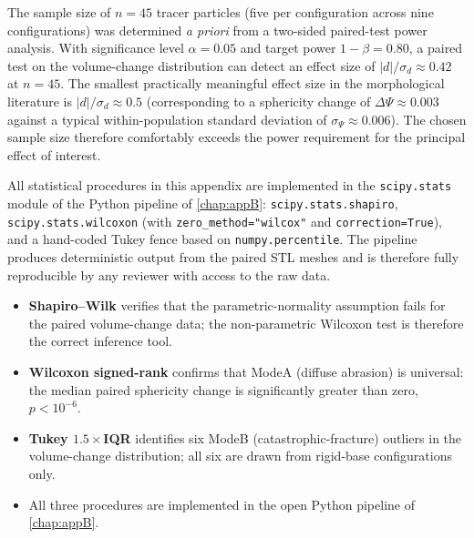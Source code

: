 The sample size of $n=45$ tracer particles (five per configuration
across nine configurations) was determined \emph{a priori} from a
two-sided paired-test power analysis. With significance level
$\alpha=0.05$ and target power $1-\beta = 0.80$, a paired test on the
volume-change distribution can detect an effect size of
$|d|/\sigma_d \approx 0.42$ at $n=45$. The smallest practically
meaningful effect size in the morphological literature is
$|d|/\sigma_d \approx 0.5$ (corresponding to a sphericity change of
$\Delta \Psi \approx 0.003$ against a typical within-population
standard deviation of $\sigma_\Psi \approx 0.006$). The chosen
sample size therefore comfortably exceeds the power requirement for
the principal effect of interest.

\begin{thesisnote}[title=Reproducibility]
All statistical procedures in this appendix are implemented in the
\texttt{scipy.stats} module of the Python pipeline of
\cref{chap:appB}: \texttt{scipy.stats.shapiro},
\texttt{scipy.stats.wilcoxon} (with \texttt{zero\_method="wilcox"}
and \texttt{correction=True}), and a hand-coded Tukey fence based on
\texttt{numpy.percentile}. The pipeline produces deterministic
output from the paired \gls{STL} meshes and is therefore fully
reproducible by any reviewer with access to the raw data.
\end{thesisnote}

\begin{chaptertakeaways}
\begin{itemize}[leftmargin=*,itemsep=2pt,topsep=2pt]
    \item \textbf{Shapiro--Wilk} verifies that the
          parametric-normality assumption fails for the paired
          volume-change data; the non-parametric Wilcoxon test is
          therefore the correct inference tool.
    \item \textbf{Wilcoxon signed-rank} confirms that \gls{ModeA}
          (diffuse abrasion) is universal: the median paired
          sphericity change is significantly greater than zero,
          $p<10^{-6}$.
    \item \textbf{Tukey $1.5\times$\gls{IQR}} identifies six
          \gls{ModeB} (catastrophic-fracture) outliers in the
          volume-change distribution; all six are drawn from rigid-base
          configurations only.
    \item All three procedures are implemented in the open Python
          pipeline of \cref{chap:appB}.
\end{itemize}
\end{chaptertakeaways}

